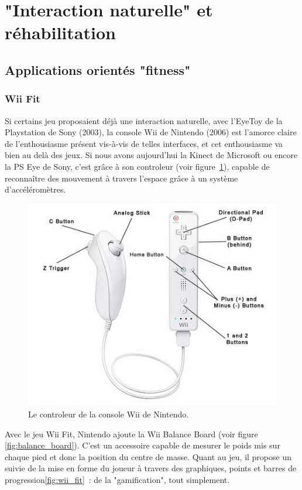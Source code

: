 \section{"Interaction naturelle" et réhabilitation}

\subsection{Applications orientés "fitness"}

\subsubsection{Wii Fit}

Si certains jeu proposaient déjà une interaction naturelle, avec l'EyeToy 
de la Playstation de Sony (2003), la console Wii de Nintendo (2006) est 
l'amorce claire de l'enthousiasme présent vis-à-vis de telles interfaces, et cet enthousiasme va bien
au delà des jeux. 
Si nous avons aujourd'hui la Kinect de Microsoft ou encore la
PS Eye de Sony, c'est grâce à son controleur (voir figure~\ref{fig:wii}), 
capable de reconnaître des mouvement à 
travers l'espace grâce à un système d'accéléromètres. 

\begin{figure}[h!]
\centering
\includegraphics[width=0.7\linewidth]{images/wii_diagram}
\caption{Le controleur de la console Wii de Nintendo.}
\label{fig:wii}
\end{figure}

Avec le jeu Wii Fit, Nintendo ajoute la Wii Balance Board (voir figure 
\ref{fig:balance_board}). C'est un accessoire capable de mesurer le 
poids mis sur chaque pied et donc la position du centre de masse. Quant au jeu,
il propose un suivie de la mise en forme du joueur à travers des graphiques, 
points et barres de progression\ref{fig:wii_fit}~: de la "gamification", 
tout simplement.

